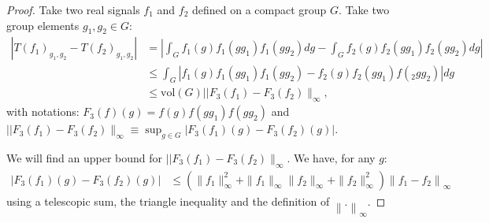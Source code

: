 \documentclass{article}
\begin{document}
\begin{proof}

Take two real signals $f_1$ and $f_2$ defined on a compact group $G$. Take two group elements $g_1, g_2 \in G$:
\begin{align*}
 \left|T\left(f_1\right)_{g_1,g_2}-T(f_2)_{g_1,g_2}\right|
    &=\left|\int_G f_1(g)f_1(gg_1)f_1(gg_2) dg - \int_G f_2(g)f_2(gg_1)f_2(gg_2)  dg\right| \\
    & \leq \int_G\left|f_1(g)f_1(gg_1)f_1(gg_2) -  f_2(g)f_2(gg_1)f(_2gg_2)\right| dg \\
    & \leq \text{vol}(G) ||F_3(f_1) - F_3(f_2)\|_{\infty},
\end{align*}
with notations: $F_3(f)(g) =  f(g)f(gg_1)f(gg_2)$ and $||F_3(f_1) - F_3(f_2)\|_{\infty} \equiv \sup_{g \in G} |F_3(f_1)(g) - F_3(f_2)(g)| $.

We will find an upper bound for $||F_3(f_1) - F_3(f_2)\|_{\infty}$. We have, for any $g$:
\begin{align*}
    |F_3(f_1)(g) - F_3(f_2)(g)|
        &\leq \left( \|f_1\|_\infty^2 + \|f_1\|_\infty\|f_2\|_\infty + \|f_2\|_\infty^2\right) \left\|f_1-f_2\right\|_{\infty}
\end{align*}
using a telescopic sum, the triangle inequality and the definition of $\left\|.\right\|_{\infty}$.


\end{proof}
\end{document}
